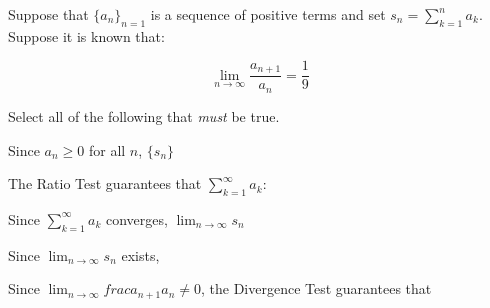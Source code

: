 \documentclass{ximera}
\author{Jim Talamo}
\begin{document}
\begin{exercise}
Suppose that $\{a_n\}_{n=1}$ is a sequence of positive terms and set $s_n = \sum_{k=1}^n a_k$.  Suppose it is known that:

\[
\lim_{n \to \infty} \frac{a_{n+1}}{a_n} = \frac{1}{9}
\]


Select all of the following that \emph{must} be true.

\begin{selectAll}
\end{selectAll}

\begin{hint}
Since $a_n \geq 0$ for all $n$, $\{s_n\}$
\begin{multipleChoice}
\end{multipleChoice}

The Ratio Test guarantees that $\sum_{k=1}^{\infty} a_k$:

\begin{multipleChoice}
\end{multipleChoice}


\begin{question}

Since $\sum_{k=1}^{\infty} a_k$ converges, $\lim_{n \to \infty} s_n$
\begin{multipleChoice}
\end{multipleChoice}

\begin{question}
Since $\lim_{n \to \infty} s_n$ exists,
\begin{multipleChoice}
\end{multipleChoice}

\end{question}
\end{question}

Since $\lim_{n \to \infty} frac{a_{n+1}}{a_n} \neq 0$, the Divergence Test guarantees that

\begin{multipleChoice}
\end{multipleChoice}

\end{hint}

\end{exercise}
\end{document}
